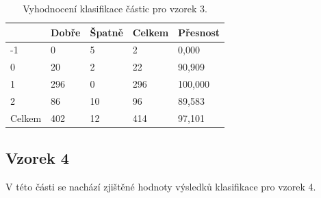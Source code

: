 \documentclass[11pt,twoside,a4paper,table]{book}
\begin{document}
\begin{table}[h]
\begin{center}
\begin{tabular}{lllll}
\rowcolor[HTML]{9B9B9B} 
\multicolumn{1}{|l|}{\cellcolor[HTML]{9B9B9B}Třída} & \multicolumn{1}{l|}{\cellcolor[HTML]{9B9B9B}Dobře} & \multicolumn{1}{l|}{\cellcolor[HTML]{9B9B9B}Špatně}  & \multicolumn{1}{l|}{\cellcolor[HTML]{9B9B9B}Celkem} & \multicolumn{1}{l|}{\cellcolor[HTML]{9B9B9B}Přesnost} \\ \hline
\multicolumn{1}{|l|}{-1}                            & \multicolumn{1}{l|}{0}                             & \multicolumn{1}{l|}{5}                               & \multicolumn{1}{l|}{2}                              & \multicolumn{1}{l|}{0,000}                            \\ \hline
\multicolumn{1}{|l|}{0}                             & \multicolumn{1}{l|}{20}                            & \multicolumn{1}{l|}{2}                               & \multicolumn{1}{l|}{22}                             & \multicolumn{1}{l|}{90,909}                           \\ \hline
\multicolumn{1}{|l|}{1}                             & \multicolumn{1}{l|}{296}                           & \multicolumn{1}{l|}{0}                               & \multicolumn{1}{l|}{296}                            & \multicolumn{1}{l|}{100,000}                          \\ \hline
\multicolumn{1}{|l|}{2}                             & \multicolumn{1}{l|}{86}                            & \multicolumn{1}{l|}{10}                              & \multicolumn{1}{l|}{96}                             & \multicolumn{1}{l|}{89,583}                           \\ \hline
\multicolumn{1}{|l|}{Celkem}                        & \multicolumn{1}{l|}{402}                           & \multicolumn{1}{l|}{12}                              & \multicolumn{1}{l|}{414}                            & \multicolumn{1}{l|}{97,101}                           \\ \hline
\end{tabular}
\end{center}
\caption{Vyhodnocení klasifikace částic pro vzorek 3.}
\label{tab:classresult3}
\end{table}

\FloatBarrier
\subsection{Vzorek 4}
V této části se nachází zjištěné hodnoty výsledků klasifikace pro vzorek 4.
\end{document}
